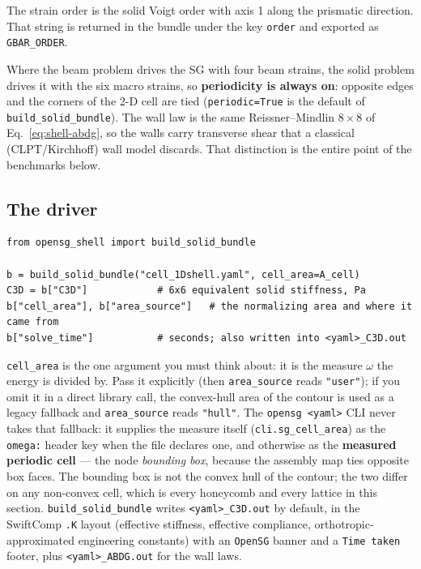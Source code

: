 The strain order is the solid Voigt order
with axis 1 along the prismatic direction. That string is returned in the bundle
under the key \texttt{order} and exported as \texttt{GBAR\_ORDER}.

Where the beam problem drives the SG with four beam strains, the solid problem
drives it with the six macro strains, so \textbf{periodicity is always on}:
opposite edges and the corners of the 2-D cell are tied
(\texttt{periodic=True} is the default of \texttt{build\_solid\_bundle}). The wall
law is the same Reissner--Mindlin $8\times8$ of Eq.~\eqref{eq:shell-abdg}, so the
walls carry transverse shear that a classical (CLPT/Kirchhoff) wall model
discards. That distinction is the entire point of the benchmarks below.

\subsection{The driver}

\begin{lstlisting}[style=opensg,caption={The one call for equivalent-solid properties from a cross-section SG.},basicstyle=\ttfamily\footnotesize]
from opensg_shell import build_solid_bundle

b = build_solid_bundle("cell_1Dshell.yaml", cell_area=A_cell)
C3D = b["C3D"]            # 6x6 equivalent solid stiffness, Pa
b["cell_area"], b["area_source"]   # the normalizing area and where it came from
b["solve_time"]           # seconds; also written into <yaml>_C3D.out
\end{lstlisting}

\texttt{cell\_area} is the one argument you must think about: it is the measure
$\omega$ the energy is divided by. Pass it explicitly (then
\texttt{area\_source} reads \texttt{"user"}); if you omit it in a direct library
call, the convex-hull area of the contour is used as a legacy fallback and
\texttt{area\_source} reads \texttt{"hull"}. The \texttt{opensg <yaml>} CLI
never takes that fallback: it supplies the measure itself
(\texttt{cli.sg\_cell\_area}) as the \texttt{omega:} header key when the file
declares one, and otherwise as the \textbf{measured periodic cell} --- the node
\emph{bounding box}, because the assembly map ties opposite box faces. The
bounding box is not the convex hull of the contour; the two differ on any
non-convex cell, which is every honeycomb and every lattice in this section.
\texttt{build\_solid\_bundle} writes
\texttt{<yaml>\_C3D.out} by default, in the SwiftComp \texttt{.K} layout
(effective stiffness, effective compliance, orthotropic-approximated engineering
constants) with an \texttt{OpenSG} banner and a \texttt{Time taken} footer, plus
\texttt{<yaml>\_ABDG.out} for the wall laws.

